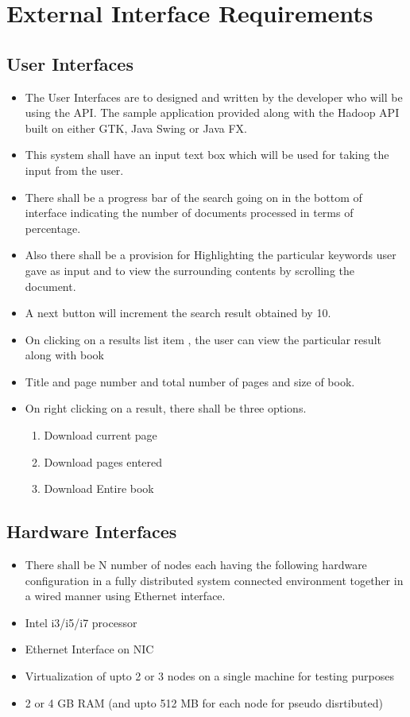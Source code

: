 \documentclass[11pt,letterpaper]{article}
\begin{document}
\newpage


\section{External Interface Requirements}

\subsection{User Interfaces}

\begin{itemize}
\item The User Interfaces are to designed and written by the developer who will be using the API. The sample application provided along with the Hadoop API built on either GTK, Java Swing or Java FX.
\item This system shall have an input text box which will be used for taking the input from the user.
\item There shall be a progress bar of the search going on in the bottom of interface indicating the number of documents processed in terms of percentage.
\item Also there shall be a provision for Highlighting the particular keywords user gave as input and to view the surrounding contents by scrolling the document.
\item A next button will increment the search result obtained by 10. 
\item On clicking on a results list item , the user can view the particular result along with book 
\item Title and page number and total number of pages and size of book.
\item On right clicking on a result, there shall be three options.

	\begin{enumerate}
	\item Download current page
	\item Download pages entered
	\item Download Entire book
	\end{enumerate}

\end{itemize}

\subsection{Hardware Interfaces}

\begin{itemize}
\item There shall be N number of nodes each having the following hardware configuration in a fully distributed system connected environment together in a wired manner using Ethernet interface.
\item Intel i3/i5/i7 processor
\item Ethernet Interface on NIC
\item Virtualization of upto 2 or 3 nodes on a single machine for testing purposes
\item 2 or 4 GB RAM (and upto 512 MB for each node for pseudo disrtibuted)
\end{itemize}
\end{document}
